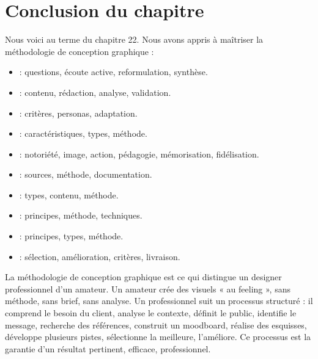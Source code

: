 \section*{Conclusion du chapitre}

Nous voici au terme du chapitre 22. Nous avons appris à maîtriser la méthodologie de conception graphique :

\begin{itemize}
    \item {} : questions, écoute active, reformulation, synthèse.
    \item {} : contenu, rédaction, analyse, validation.
    \item {} : critères, personas, adaptation.
    \item {} : caractéristiques, types, méthode.
    \item {} : notoriété, image, action, pédagogie, mémorisation, fidélisation.
    \item {} : sources, méthode, documentation.
    \item {} : types, contenu, méthode.
    \item {} : principes, méthode, techniques.
    \item {} : principes, types, méthode.
    \item {} : sélection, amélioration, critères, livraison.
\end{itemize}

La méthodologie de conception graphique est ce qui distingue un designer professionnel d'un amateur. Un amateur crée des visuels « au feeling », sans méthode, sans brief, sans analyse. Un professionnel suit un processus structuré : il comprend le besoin du client, analyse le contexte, définit le public, identifie le message, recherche des références, construit un moodboard, réalise des esquisses, développe plusieurs pistes, sélectionne la meilleure, l'améliore. Ce processus est la garantie d'un résultat pertinent, efficace, professionnel.

